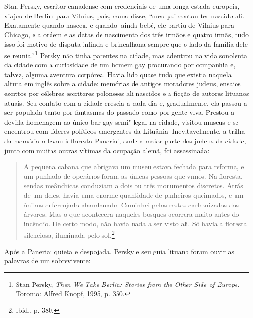 %

Stan Persky, escritor canadense com credenciais de uma longa estada
europeia, viajou de Berlim para Vilnius, pois, como disse, ``meu pai
contou ter nascido ali. Exatamente quando nasceu, e quando, ainda bebê,
ele partiu de Vilnius para Chicago, e a ordem e as datas de nascimento
dos três irmãos e quatro irmãs, tudo isso foi motivo de disputa infinda
e brincalhona sempre que o lado da família dele se reunia.''\footnote{Stan Persky, \textit{Then We Take Berlin: Stories from the Other Side of Europe.} Toronto: Alfred Knopf, 1995, p. 350.} Persky não tinha parentes na cidade, mas adentrou na vida sonolenta da cidade com a
curiosidade de um homem gay procurando por companhia e, talvez, alguma
aventura corpórea. Havia lido quase tudo que existia naquela altura em
inglês sobre a cidade: memórias de antigos moradores judeus, ensaios
escritos por célebres escritores poloneses ali nascidos e a ficção de
autores lituanos atuais. Seu contato com a cidade crescia a cada dia e,
gradualmente, ela passou a ser populada tanto por fantasmas do passado
como por gente viva. Prestou a devida homenagem ao único bar gay
semi"-legal na cidade, visitou museus e se encontrou com líderes
políticos emergentes da Lituânia. Inevitavelmente, a trilha da memória o
levou à floresta Paneriai, onde a maior parte dos judeus da cidade,
junto com muitas outras vítimas da ocupação alemã, foi assassinada:

\begin{quote}
A pequena cabana que abrigava um museu estava fechada para reforma, e um
punhado de operários foram as únicas pessoas que vimos. Na floresta,
sendas meândricas conduziam a dois ou três monumentos discretos. Atrás
de um deles, havia uma enorme quantidade de pinheiros queimados, e um
ônibus enferrujado abandonado. Caminhei pelos restos carbonizados das
árvores. Mas o que acontecera naqueles bosques ocorrera muito antes do
incêndio. De certo modo, não havia nada a ser visto ali. Só havia a
floresta silenciosa, iluminada pelo sol.\footnote{Ibid., p. 380.}
\end{quote}

Após a Paneriai quieta e despojada, Persky e seu guia lituano foram
ouvir as palavras de um sobrevivente:

